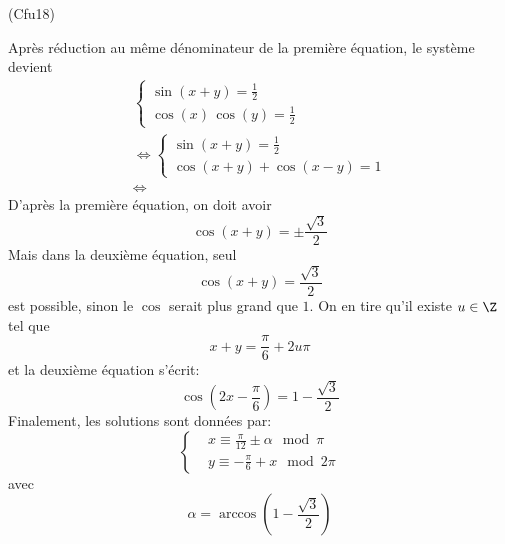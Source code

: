 \begin{tiny}(Cfu18)\end{tiny} Après réduction au même dénominateur de la première équation, le système devient
\begin{multline*}
\left\lbrace 
\begin{aligned}
\sin(x+y) = \frac{1}{2} \\ \cos(x) \, \cos(y) = \frac{1}{2}  
\end{aligned}
\right. \\
\Leftrightarrow
\left\lbrace 
\begin{aligned}
\sin(x+y) = \frac{1}{2} \\ \cos(x+y) + \cos(x-y) = 1  
\end{aligned}
\right. \\
\Leftrightarrow
\end{multline*}
D'après la première équation, on doit avoir 
\begin{displaymath}
  \cos(x+y) = \pm \frac{\sqrt{3}}{2}
\end{displaymath}
Mais dans la deuxième équation, seul
\begin{displaymath}
  \cos(x+y) = \frac{\sqrt{3}}{2}
\end{displaymath}
est possible, sinon le $\cos$ serait plus grand que $1$. On en tire qu'il existe $u\in \Z$ tel que
\begin{displaymath}
  x+y = \frac{\pi}{6} + 2u\pi
\end{displaymath}
et la deuxième équation s'écrit:
\begin{displaymath}
\cos(2x-\frac{\pi}{6})=1-\frac{\sqrt{3}}{2}  
\end{displaymath}
Finalement, les solutions sont données par:
\begin{displaymath}
\left\lbrace 
\begin{aligned}
&x \equiv \frac{\pi}{12} \pm \alpha \mod \pi \\
&y \equiv -\frac{\pi}{6} + x \mod 2\pi
\end{aligned}
\right. 
\end{displaymath}
avec
\begin{displaymath}
  \alpha = \arccos(1-\frac{\sqrt{3}}{2})
\end{displaymath}
